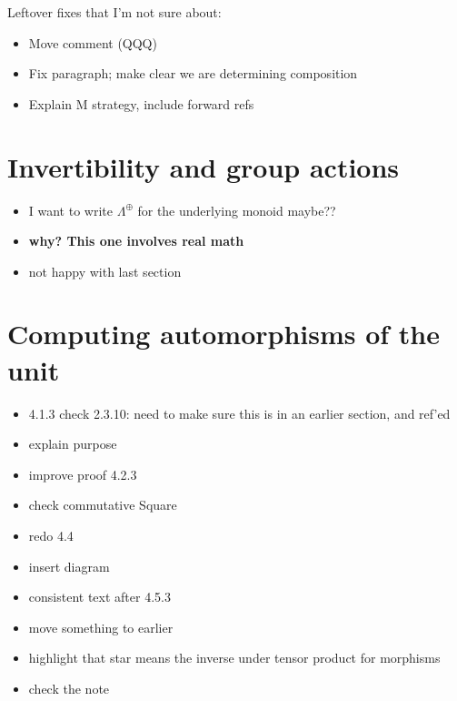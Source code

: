 \documentclass{amsart}
\begin{document}
Leftover fixes that I'm not sure about:
\begin{itemize}
\item Move comment (QQQ)
\item Fix paragraph; make clear we are determining composition
\item Explain M strategy, include forward refs
\end{itemize}



\section{ Invertibility and group actions}

\begin{itemize}
\item I want to write $\Lambda^{\oplus}$ for the underlying monoid maybe??
\item \textbf{why? This one involves real math}
\item not happy with last section
\end{itemize}



\section{ Computing automorphisms of the unit}

\begin{itemize}




\item 4.1.3 check 2.3.10: need to make sure this is in an earlier section, and ref'ed


\item explain purpose
\item improve proof 4.2.3

\item check commutative Square

\item redo 4.4
\item insert diagram

\item consistent text after 4.5.3
\item move something to earlier


\item highlight that star means the inverse under tensor product for morphisms




\item check the note


\end{itemize}
\end{document}
